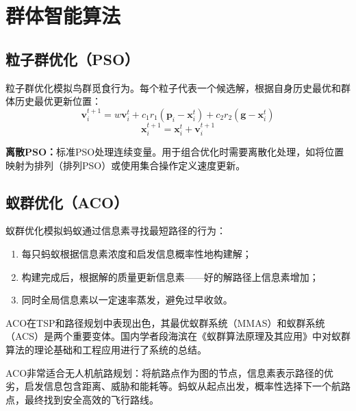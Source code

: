 \section{群体智能算法 \grad}

\subsection{粒子群优化（PSO）}

粒子群优化模拟鸟群觅食行为。每个粒子代表一个候选解，根据自身历史最优和群体历史最优更新位置：
$$\mathbf{v}_i^{t+1} = w\mathbf{v}_i^t + c_1 r_1 (\mathbf{p}_i - \mathbf{x}_i^t) + c_2 r_2 (\mathbf{g} - \mathbf{x}_i^t)$$
$$\mathbf{x}_i^{t+1} = \mathbf{x}_i^t + \mathbf{v}_i^{t+1}$$

\textbf{离散PSO：}标准PSO处理连续变量。用于组合优化时需要离散化处理，如将位置映射为排列（排列PSO）或使用集合操作定义速度更新。

\subsection{蚁群优化（ACO）}

蚁群优化模拟蚂蚁通过信息素寻找最短路径的行为：

\begin{enumerate}
  \item 每只蚂蚁根据信息素浓度和启发信息概率性地构建解；
  \item 构建完成后，根据解的质量更新信息素——好的解路径上信息素增加；
  \item 同时全局信息素以一定速率蒸发，避免过早收敛。
\end{enumerate}

ACO在TSP和路径规划中表现出色，其最优蚁群系统（MMAS）和蚁群系统（ACS）是两个重要变体。国内学者段海滨在《蚁群算法原理及其应用》中对蚁群算法的理论基础和工程应用进行了系统的总结。

\begin{appbox}[title={\textbf{应用：无人机航路规划}}]
ACO非常适合无人机航路规划：将航路点作为图的节点，信息素表示路径的优劣，启发信息包含距离、威胁和能耗等。蚂蚁从起点出发，概率性选择下一个航路点，最终找到安全高效的飞行路线。

\end{appbox}

